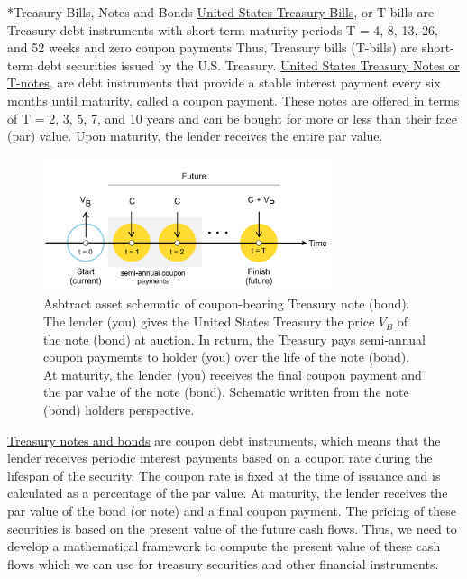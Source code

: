 \documentclass[11pt]{article}
\makeatletter
\theoremstyle{definition}
\renewcommand\subsection{\@startsection
	{subsection}{2}{0mm}
	{-0.05in}
	{0.5\baselineskip}
	{\normalfont\normalsize\bfseries}}
\makeatother
\begin{document}
\subsection*{Treasury Bills, Notes and Bonds}\label{sec:treasury-bills}
\href{https://treasurydirect.gov/marketable-securities/treasury-bills/}{United States Treasury Bills}, or T-bills are Treasury debt instruments with short-term maturity periods T = 4, 8, 13, 26, and 52 weeks and zero coupon payments
Thus, Treasury bills (T-bills) are short-term debt securities issued by the U.S. Treasury. \href{https://treasurydirect.gov/marketable-securities/treasury-notes/}{United States Treasury Notes or T-notes}, 
are debt instruments that provide a stable interest payment every six months until maturity, called a coupon payment.
These notes are offered in terms of T = 2, 3, 5, 7, and 10 years and can be bought for more or less than their face (par) value. 
Upon maturity, the lender receives the entire par value. 
\begin{figure}[h]
    \centering
    \includegraphics[width=0.75\textwidth]{./figs/Fig-Bond-Asset-Timeline-Schematic.pdf}
    \caption{Asbtract asset schematic of coupon-bearing Treasury note (bond). The lender (you) gives the United States Treasury 
    the price $V_{B}$ of the note (bond) at auction. In return, the Treasury pays semi-annual coupon paymemts to holder (you) 
    over the life of the note (bond). At maturity, the lender (you) receives the final coupon payment
    and the par value of the note (bond). Schematic written from the note (bond) holders perspective.}\label{fig:govt-note-bound-schematic}
\end{figure}
\href{https://treasurydirect.gov/marketable-securities/treasury-bonds/}{Treasury notes and bonds} are coupon debt instruments, which means that the lender receives periodic interest payments based on a coupon rate during the lifespan of the security. 
The coupon rate is fixed at the time of issuance and is calculated as a percentage of the par value. 
At maturity, the lender receives the par value of the bond (or note) and a final coupon payment. The pricing of these securities is based on the present value of the future cash flows. 
Thus, we need to develop a mathematical framework to compute the present value of these cash flows which we can use for 
treasury securities and other financial instruments.
\end{document}
